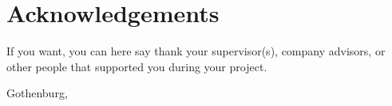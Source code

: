 \thispagestyle{plain}
\section*{Acknowledgements}
If you want, you can here say thank your supervisor(s), company advisors, or other people that supported you during your project.

\vspace{1.5cm}
\hfill
\membertildelist{} Gothenburg, \monthname \space \the\year

\newpage

\thispagestyle{empty}
\mbox{}